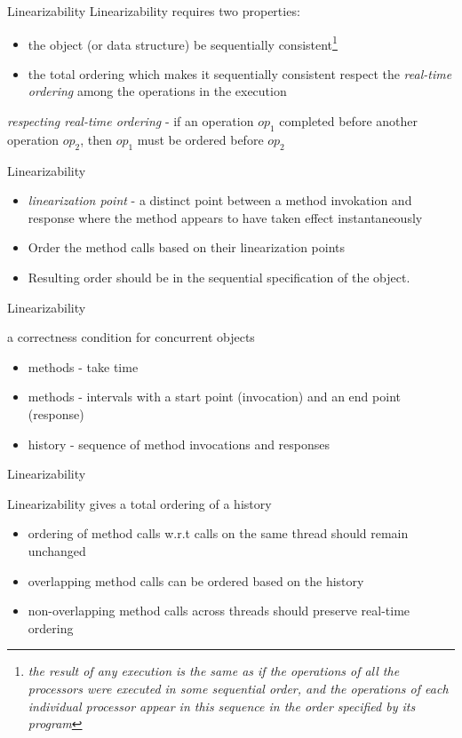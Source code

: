 \begin{frame}{Linearizability}
Linearizability requires two properties:
\begin{itemize}
\item the object (or data structure) be sequentially consistent\footnote{\textit{\tiny the result of any execution is the same as if the operations of all the processors were executed in some sequential order, and the operations of each individual processor appear in this sequence in the order specified by its program}}
\item the total ordering which makes it sequentially consistent respect the \emph{real-time ordering} among the operations in the execution
\end{itemize}
\emph{respecting real-time ordering} - if an operation $op_1$ completed before another operation $op_2$, then $op_1$ must be ordered before $op_2$
\end{frame}

\begin{frame}{Linearizability}
\begin{itemize}
\item \emph{linearization point} - a distinct point between a method invokation and response where the method appears to have taken effect instantaneously
\item Order the method calls based on their linearization points
\item Resulting order should be in the sequential specification of the object.
\end{itemize}
\end{frame}
\fi

\begin{frame}{Linearizability}
\begin{center}
a correctness condition for concurrent objects
\end{center}
\pause
\begin{itemize}
\item methods - take time
\item methods - intervals with a start point (invocation) and an end point (response)
\item history - sequence of method invocations and responses
\end{itemize}
\end{frame}

\begin{frame}{Linearizability}
\begin{center}
Linearizability gives a total ordering of a history
\end{center}
\pause
\begin{itemize}
\item ordering of method calls w.r.t calls on the same thread should remain unchanged
\item overlapping method calls can be ordered based on the history
\item non-overlapping method calls across threads should preserve real-time ordering
\end{itemize}
\end{frame}

